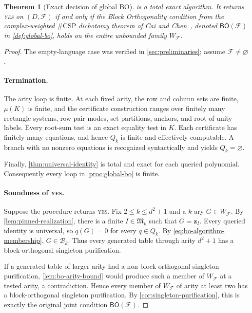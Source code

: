 \documentclass[11pt]{article}
\theoremstyle{plain}
\newtheorem{theorem}{Theorem}[section]
\theoremstyle{definition}
\theoremstyle{remark}
\newcommand{\cF}{\mathcal F}
\newcommand{\BO}{\mathsf{BO}}
\newcommand{\zvec}[1]{\mathbf z_{#1}}
\newcommand{\InstMonoid}[1]{\mathfrak M_{#1}}
\newcommand{\YES}{\textnormal{\textsc{yes}}}
\begin{document}
\begin{theorem}[Exact decision of global BO]
\label{thm:global-bo-decidable}
 is a total exact algorithm.  It returns \YES{}
on $(D,\cF)$ if and only if the Block Orthogonality condition from the
complex-weighted $\#\mathrm{CSP}$ dichotomy theorem of Cai and
Chen~\cite[Section~3.1]{CaiChen2017}, denoted $\BO(\cF)$ in
\cref{def:global-bo}, holds on the entire unbounded family $W_{\cF}$.
\end{theorem}

\begin{proof}
The empty-language case was verified in \cref{sec:preliminaries}; assume
$\cF\ne\varnothing$.

\paragraph{Termination.}
The arity loop is finite.  At each fixed arity, the row and column sets are
finite, $\mu(K)$ is finite, and the certificate construction ranges over
finitely many rectangle systems, row-pair modes, set partitions, anchors,
and root-of-unity labels.  Every root-sum test is an exact equality test in
$K$.  Each certificate has finitely many equations, and hence $Q_k$ is
finite and effectively computable.  A branch with no nonzero equations is
recognized syntactically and yields $Q_k=\varnothing$.

Finally, \cref{thm:universal-identity} is total and exact for each queried
polynomial.  Consequently every loop in \cref{proc:global-bo} is finite.

\paragraph{Soundness of \YES.}
Suppose the procedure returns \YES.  Fix
$2\le k\le d^2+1$ and a $k$-ary $G\in W_{\cF}$.  By
\cref{lem:pinned-realization}, there is a finite
$I\in\InstMonoid{k}$ such that $G=\zvec I$.  Every queried identity is
universal, so $q(G)=0$ for every $q\in Q_k$.  By
\eqref{eq:bo-algorithm-membership}, $G\in\mathcal B_k$.  Thus every generated
table through arity $d^2+1$ has a block-orthogonal singleton purification.

If a generated table of larger arity had a non-block-orthogonal singleton
purification, \cref{lem:bo-arity-bound} would produce such a member of
$W_{\cF}$ at a tested arity, a contradiction.  Hence every member of
$W_{\cF}$ of arity at least two has a block-orthogonal singleton
purification.  By \cref{cor:singleton-purification}, this is exactly the
original joint condition $\BO(\cF)$.


\end{proof}
\end{document}
